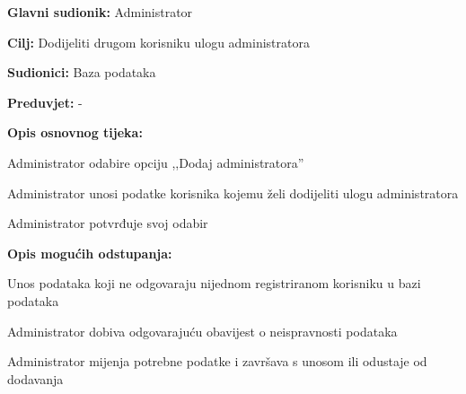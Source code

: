 						\begin{packed_item}
							
							\item \textbf{Glavni sudionik: }Administrator
							\item  \textbf{Cilj: }Dodijeliti drugom korisniku ulogu administratora
							\item  \textbf{Sudionici: }Baza podataka
							\item  \textbf{Preduvjet: }-
							\item  \textbf{Opis osnovnog tijeka:}
							
							\item[] \begin{packed_enum}
								
								\item Administrator odabire opciju ,,Dodaj administratora”
								\item Administrator unosi podatke korisnika kojemu želi dodijeliti ulogu administratora
								\item Administrator potvrđuje svoj odabir
								
							\end{packed_enum}
							\item  \textbf{Opis mogućih odstupanja:}
							
							\item[] \begin{packed_item}
								
								\item[2.a] Unos podataka koji ne odgovaraju nijednom registriranom korisniku u bazi podataka 
								\item[] \begin{packed_enum}
									
									\item Administrator dobiva odgovarajuću obavijest o neispravnosti podataka
									\item Administrator mijenja potrebne podatke i završava s unosom ili odustaje od dodavanja
									
									
								\end{packed_enum}
								
							\end{packed_item}
							
							
						\end{packed_item}
						
						
						
								
						
